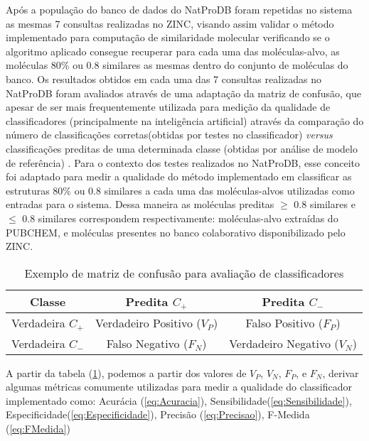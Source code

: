 Após a população do banco de dados do NatProDB foram repetidas no sistema as mesmas 7 consultas realizadas no ZINC, visando assim validar o método implementado para computação de similaridade molecular verificando se o algoritmo aplicado consegue recuperar para cada uma das moléculas-alvo, as moléculas 80\% ou 0.8 similares as mesmas dentro do conjunto de moléculas do banco. Os resultados obtidos em cada uma das 7 consultas realizadas no NatProDB foram avaliados através de uma adaptação da matriz de confusão, que apesar de ser mais frequentemente utilizada para medição da qualidade de classificadores (principalmente na inteligência artificial) através da comparação do número de classificações corretas(obtidas por testes no classificador) \textit{versus} classificações preditas de uma determinada classe (obtidas por análise de modelo de referência) \cite{davis2006relationship}. Para o contexto dos testes realizados no NatProDB, esse conceito foi adaptado para medir a qualidade do método implementado em classificar as estruturas 80\% ou 0.8 similares a cada uma das moléculas-alvos utilizadas como entradas para o sistema. Dessa maneira as moléculas preditas $\geq$ 0.8 similares e $\leq$ 0.8 similares correspondem respectivamente: moléculas-alvo extraídas do PUBCHEM, e moléculas presentes no banco colaborativo disponibilizado pelo ZINC.

\begin{table}[!htb]
	\centering
	\footnotesize
	\caption[Matriz de Confusão]{Exemplo de matriz de confusão para avaliação de classificadores}
	\label{tab:matrizconfusao}	
	\begin{tabular}{|c|c|c|}
		\hline \SPACE
		\textbf{Classe}&\textbf{Predita $C_+$} & \textbf{Predita $C_-$} \\ \hline \SPACE
	Verdadeira $C_+$  &	Verdadeiro Positivo ($V_P$) & Falso Positivo ($F_P$) \\ \hline \SPACE
	Verdadeira $C_-$  & Falso Negativo ($F_N$) & Verdadeiro Negativo ($V_N$)\\ \hline 
	\end{tabular}
\end{table}  

A partir da tabela (\ref{tab:matrizconfusao}), podemos  a partir dos valores de $V_P$, $V_N$, $F_P$, e $F_N$, derivar algumas métricas comumente utilizadas para medir a qualidade do classificador implementado como: Acurácia (\ref{eq:Acuracia}), Sensibilidade(\ref{eq:Sensibilidade}), Especificidade(\ref{eq:Especificidade}), Precisão (\ref{eq:Precisao}), F-Medida (\ref{eq:FMedida})

